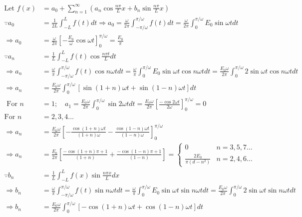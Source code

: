 \begin{enumerate}
\begin{answer}
\begin{align*}
	\text{Let }f(x)&=a_{0}+\sum_{n=1}^{\infty}\left(a_{n} \cos \frac{n \pi}{L} x+b_{n} \sin \frac{n \pi}{L} x\right)\\
	\because a_{0}&=\frac{1}{2 L} \int_{-L}^{L} f(t) d t \Rightarrow a_{0}=\frac{\omega}{2 \pi} \int_{-\pi / \omega}^{\pi / \omega} f(t) d t=\frac{\omega}{2 \pi} \int_{0}^{\pi / \omega} E_{0} \sin \omega t d t\\
	\Rightarrow a_{0}&=\frac{\omega}{2 \pi}\left[-\frac{E_{0}}{\omega} \cos \omega t\right]_{0}^{\pi / \omega}=\frac{E_{0}}{\pi}\\
	\because a_{n}&=\frac{1}{L} \int_{-L}^{L} f(t) \cos \frac{n \pi t}{L} d t\\
	\Rightarrow a_{n}&=\frac{\omega}{\pi} \int_{-\pi / \omega}^{\pi / \omega} f(t) \cos n \omega t d t=\frac{\omega}{\pi} \int_{0}^{\pi / \omega} E_{0} \sin \omega t \cos n \omega t d t=\frac{E_{0} \omega}{2 \pi} \int_{0}^{\pi / \omega} 2 \sin \omega t \cos n \omega t d t\\
	\Rightarrow a_{n}&=\frac{E_{0} \omega}{2 \pi} \int_{0}^{\pi / \omega}[\sin (1+n) \omega t+\sin (1-n) \omega t] d t\\
	\text { For } n&=1 ; \quad a_{1}=\frac{E_{0} \omega}{2 \pi} \int_{0}^{\pi / \omega} \sin 2 \omega t d t=\frac{E_{0} \omega}{2 \pi}\left[\frac{-\cos 2 \omega t}{2 \omega}\right]_{0}^{\pi / \omega}=0\\
	\text{For }n&=2,3,4 \ldots\\
	\Rightarrow a_{n}&=\frac{E_{0} \omega}{2 \pi}\left[-\frac{\cos (1+n) \omega t}{(1+n) \omega}-\frac{\cos (1-n) \omega t}{(1-n) \omega}\right]_{0}^{\pi / \omega}\\
	\Rightarrow a_{n}&=\frac{E_{0}}{2 \pi}\left[\frac{-\cos (1+n) \pi+1}{(1+n)}+\frac{-\cos (1-n) \pi+1}{(1-n)}\right]=\left\{\begin{array}{cc}0 & n=3,5,7 \ldots \\ \frac{2 E_{0}}{\pi\left(d-n^{2}\right)} & n=2,4,6 \ldots\end{array}\right.\\
	\because b_{n}&=\frac{1}{L} \int_{-L}^{L} f(x) \sin \frac{n \pi x}{L} d x\\
	\Rightarrow b_{n}&=\frac{\omega}{\pi} \int_{-\pi / \omega}^{\pi / \omega} f(t) \sin n \omega t d t=\frac{\omega}{\pi} \int_{0}^{\pi / \omega} E_{0} \sin \omega t \sin n \omega t d t=\frac{E_{0} \omega}{2 \pi} \int_{0}^{\pi / \omega} 2 \sin \omega t \sin n \omega t d t\\
	\Rightarrow b_{n}&=\frac{E_{0} \omega}{2 \pi} \int_{0}^{\pi / \omega}[-\cos (1+n) \omega t+\cos (1-n) \omega t] d t\\

\end{align*}
\end{answer}
\end{enumerate}
